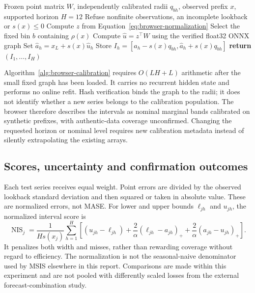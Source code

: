 \begin{algorithm}[htbp]
\caption{Fixed-point forecast with prefix-stratified marginal intervals. Every
quantity used at prediction time is determined before observing the next target.}
\label{alg:browser-calibration}
\begin{algorithmic}[1]
\Require Frozen point matrix $W$, independently calibrated radii $q_{bh}$,
observed prefix $x$, supported horizon $H=12$
\State Refuse nonfinite observations, an incomplete lookback or $s(x)\leq0$
\State Compute $z$ from Equation~\ref{eq:browser-normalization}
\State Select the fixed bin $b$ containing $\rho(x)$
\State Compute $\hat u=z^\top W$ using the verified float32 ONNX graph
\State Set $\hat a_h=x_L+s(x)\hat u_h$
\State Store $I_h=[\hat a_h-s(x)q_{bh},\hat a_h+s(x)q_{bh}]$
\EndFor
\State \textbf{return} $(I_1,\ldots,I_H)$
\end{algorithmic}
\end{algorithm}

Algorithm~\ref{alg:browser-calibration} requires $O(LH+L)$ arithmetic after
the small fixed graph has been loaded. It carries no recurrent hidden state
and performs no online refit. Hash verification binds the graph to the radii;
it does not identify whether a new series belongs to the calibration
population. The browser therefore describes the intervals as nominal marginal
bands calibrated on synthetic prefixes, with authentic-data coverage
unconfirmed. Changing the requested horizon or nominal level requires new
calibration metadata instead of silently extrapolating the existing arrays.

\subsection{Scores, uncertainty and confirmation outcomes}
\label{sec:browser-results}

Each test series receives equal weight. Point errors are divided by the
observed lookback standard deviation and then squared or taken in absolute
value. These are normalized errors, not MASE. For lower and upper bounds
$\ell_{jh}$ and $u_{jh}$, the normalized interval score is
\begin{equation}
 \operatorname{NIS}_j=\frac{1}{Hs(x_j)}\sum_{h=1}^H
 \left[(u_{jh}-\ell_{jh})+
 \frac{2}{\alpha}(\ell_{jh}-a_{jh})_+
 +\frac{2}{\alpha}(a_{jh}-u_{jh})_+\right].
 \label{eq:browser-score}
\end{equation}
It penalizes both width and misses, rather than rewarding coverage without
regard to efficiency. The normalization is not the seasonal-naive denominator
used by MSIS elsewhere in this report. Comparisons are made within this
experiment and are not pooled with differently scaled losses from the external
forecast-combination study.

